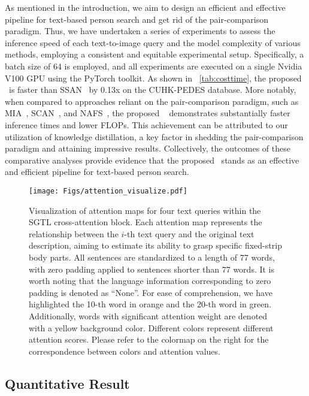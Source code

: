 As mentioned in the introduction, we aim to design an efficient and effective pipeline for text-based person search and get rid of the pair-comparison paradigm. Thus, we have undertaken a series of experiments to assess the inference speed of each text-to-image query and the model complexity of various methods, employing a consistent and equitable experimental setup. Specifically, a batch size of 64 is employed, and all experiments are executed on a single Nvidia V100 GPU using the PyTorch toolkit. 
As shown in \tablename~\ref{tab:costtime}, the proposed \ourmodel~is faster than SSAN~\cite{ssan} by 0.13x on the CUHK-PEDES database. More notably, when compared to approaches reliant on the pair-comparison paradigm, such as MIA~\cite{niu2020mia}, SCAN~\cite{lee2018stacked}, and NAFS~\cite{gao2021contextual}, the proposed \ourmodel~ demonstrates substantially faster inference times and lower FLOPs. This achievement can be attributed to our utilization of knowledge distillation, a key factor in shedding the pair-comparison paradigm and attaining impressive results.
Collectively, the outcomes of these comparative analyses provide evidence that the proposed \ourmodel~stands as an effective and efficient pipeline for text-based person search.



\begin{figure*}[t]
	\centering
	\texttt{[image: Figs/attention\_visualize.pdf]}
	\caption{\small{Visualization of attention maps for four text queries within the SGTL cross-attention block. Each attention map represents the relationship between the $i$-th text query and the original text description, aiming to estimate its ability to grasp specific fixed-strip body parts. All sentences are standardized to a length of 77 words, with zero padding applied to sentences shorter than 77 words. 
    It is worth noting that the language information corresponding to zero padding is denoted as ``None''. For ease of comprehension, we have highlighted the 10-th word in orange and the 20-th word in green.
Additionally, words with significant attention weight are denoted with a yellow background color.
 Different colors represent different attention scores. Please refer to the colormap on the right for the correspondence between colors and attention values.
}}\label{fig:attention_visualize}
\end{figure*}

\subsection{Quantitative Result}

